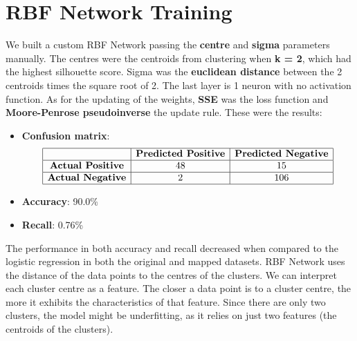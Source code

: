 \documentclass[a4paper,12pt]{article}
\begin{document}
\section{RBF Network Training}
\label{sec:rbf-network}
We built a custom RBF Network passing the \textbf{centre} and \textbf{sigma} parameters manually. The centres were the centroids from clustering when \textbf{k = 2}, which had the highest silhouette score. Sigma was the \textbf{euclidean distance} between the 2 centroids times the square root of 2. The last layer is 1 neuron with no activation function. As for the updating of the weights, \textbf{SSE} was the loss function and \textbf{Moore-Penrose pseudoinverse} the update rule. These were the results:
\begin{itemize}
    \item \textbf{Confusion matrix}: 
    \[
    \begin{array}{|c|c|c|}
    \hline
    & \textbf{Predicted Positive} & \textbf{Predicted Negative} \\
    \hline
    \textbf{Actual Positive} & 48 & 15 \\
    \hline
    \textbf{Actual Negative} & 2 & 106 \\
    \hline
    \end{array}
    \]
    \item \textbf{Accuracy}: 90.0\%
    \item \textbf{Recall}: 0.76\%
\end{itemize}

The performance in both accuracy and recall decreased when compared to the logistic regression in both the original and mapped datasets.  RBF Network uses the distance of the data points to the centres of the clusters. We can interpret each cluster centre as a feature. The closer a data point is to a cluster centre, the more it exhibits the characteristics of that feature. Since there are only two clusters, the model might be underfitting, as it relies on just two features (the centroids of the clusters).
\end{document}
